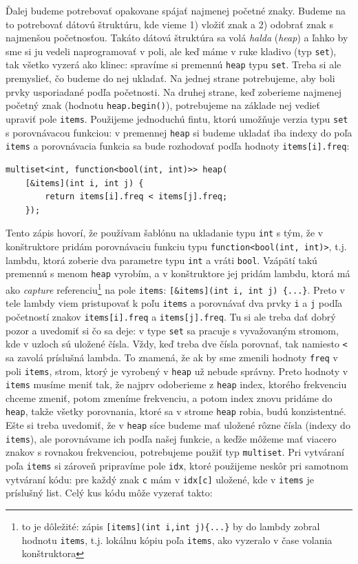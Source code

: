 \documentclass[10pt]{article}
\def\prg{\lstinline}
\def\ods{\vspace*{10pt}}
\begin{document}
{\ods
Ďalej budeme potrebovať opakovane spájať najmenej početné znaky. Budeme na to potrebovať
dátovú štruktúru, kde vieme 1) vložiť znak a 2) odobrať znak s najmenšou početnosťou. 
Takáto dátová štruktúra sa volá {\em halda} ({\em heap}) a ľahko by sme si ju 
vedeli naprogramovať v poli, ale keď máme v ruke kladivo (typ {\tt set}), tak všetko
vyzerá ako klinec: spravíme si premennú {\tt heap}  typu {\tt set}. 
Treba si ale premyslieť, čo budeme do nej
ukladať. Na jednej strane potrebujeme, aby boli prvky usporiadané podľa početnosti. 
Na druhej strane, keď zoberieme najmenej početný znak (hodnotu {\tt *heap.begin()}),
potrebujeme na základe nej vedieť upraviť pole {\tt items}. Použijeme jednoduchú fintu,
ktorú umožňuje verzia typu {\tt set} s porovnávacou funkciou: v premennej {\tt heap}
si budeme ukladať iba indexy do poľa {\tt items} a porovnávacia funkcia 
sa bude rozhodovať podľa hodnoty {\tt items[i].freq}:

\begin{lstlisting}
multiset<int, function<bool(int, int)>> heap(
    [&items](int i, int j) { 
        return items[i].freq < items[j].freq; 
    });
\end{lstlisting}

Tento zápis hovorí, že používam šablónu na ukladanie typu \prg!int! s tým,
že v konštruktore pridám porovnávaciu funkciu typu \prg!function<bool(int, int)>!,
t.j. lambdu, ktorá zoberie dva parametre typu \prg!int! a vráti \prg!bool!.
Vzápätí takú premennú s menom \prg!heap! vyrobím, a v konštruktore 
jej pridám lambdu, ktorá má ako {\em capture} referenciu\footnote{%
  to je dôležité: zápis {\tt[items](\prg!int i,int j!)\{...\}} by do lambdy
zobral hodnotu {\tt items}, t.j. 
lokálnu kópiu poľa {\tt items}, ako vyzeralo v čase volania konštruktora}
  na pole {\tt items}:
\prg![&items](int i, int j) {...}!. Preto v tele lambdy viem pristupovať k poľu
{\tt items} a porovnávať dva prvky {\tt i} a {\tt j} podľa početností znakov
\prg!items[i].freq! a \prg!items[j].freq!. Tu si ale treba dať dobrý pozor a uvedomiť si
čo sa deje: v type {\tt set} sa pracuje s vyvažovaným stromom, kde v uzloch sú uložené
čísla. Vždy, keď treba dve čísla porovnať, tak namiesto {\tt <} sa zavolá príslušná
lambda. To znamená, že ak by sme zmenili hodnoty {\tt freq} v poli {\tt items}, strom, 
ktorý je vyrobený v {\tt heap} už nebude správny. Preto hodnoty v {\tt items} musíme 
meniť tak, že najprv odoberieme z {\tt heap} index, ktorého frekvenciu chceme zmeniť,
potom zmeníme frekvenciu, a potom index znovu pridáme do {\tt heap}, takže všetky porovnania,
ktoré sa v strome {\tt heap} robia, budú konzistentné. Ešte si treba uvedomiť, 
že v {\tt heap} síce budeme mať uložené rôzne čísla (indexy do {\tt items}), ale 
porovnávame ich podľa našej funkcie, a keďže môžeme mať viacero znakov s rovnakou
frekvenciou, potrebujeme použiť typ {\tt multiset}. Pri vytváraní poľa {\tt items}
si zároveň pripravíme pole {\tt idx}, ktoré použijeme neskôr pri samotnom vytváraní kódu:
pre každý znak \prg!c! mám v \prg!idx[c]! uložené, kde v {\tt items} je príslušný list.
Celý kus kódu môže vyzerať takto:

}
\end{document}
